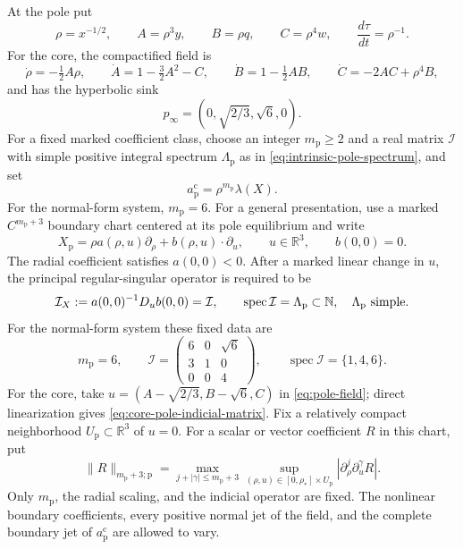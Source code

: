 \documentclass[11pt]{amsart}
\numberwithin{equation}{section}
\theoremstyle{definition}
\theoremstyle{remark}
\newcommand{\R}{\mathbb R}
\newcommand{\spec}{\operatorname {spec}}
\begin{document}
At the pole put
\begin{equation}\label{eq:pole-coordinates}
 \rho=x^{-1/2},\qquad A=\rho^3y,\qquad
 B=\rho q,\qquad C=\rho^4w,
 \qquad \frac{d\tau}{dt}=\rho^{-1}.
\end{equation}
For the core, the compactified field is
\begin{equation}\label{eq:pole-field}
 \dot\rho=-\tfrac12A\rho,\qquad
 \dot A=1-\tfrac32A^2-C,\qquad
 \dot B=1-\tfrac12AB,\qquad
 \dot C=-2AC+\rho^4B,
\end{equation}
and has the hyperbolic sink
\begin{equation}\label{eq:pole-sink}
 p_\infty=(0,\sqrt{2/3},\sqrt6,0).
\end{equation}
For a fixed marked coefficient class, choose an integer
$m_{\mathrm p}\ge2$ and a real matrix $\mathcal I$ with simple positive
integral spectrum $\Lambda_{\mathrm p}$ as in
\eqref{eq:intrinsic-pole-spectrum}, and set
\begin{equation}\label{eq:general-compactified-action-order}
 a_{\mathrm p}^{\mathrm c}=\rho^{m_{\mathrm p}}\lambda(X).
\end{equation}
For the normal-form system, $m_{\mathrm p}=6$.  For a general
presentation, use a marked $C^{m_{\mathrm p}+3}$ boundary
chart centered at its pole equilibrium and write
\begin{equation}\label{eq:general-pole-field}
 X_{\mathrm p}
 =\rho a(\rho,u)\partial_\rho+b(\rho,u)\cdot\partial_u,
 \qquad u\in\R^3,\qquad b(0,0)=0.
\end{equation}
The radial coefficient satisfies $a(0,0)<0$.  After a marked linear change
in $u$, the principal regular-singular operator is required to be
\begin{equation}\label{eq:pole-indicial-matrix}
 \mathcal I_X:=a(0,0)^{-1}D_ub(0,0)=\mathcal I,
 \qquad
 \spec\mathcal I=\Lambda_{\mathrm p}\subset\mathbb N,
 \quad \Lambda_{\mathrm p}\ \hbox{simple}.
\end{equation}
For the normal-form system these fixed data are
\begin{equation}\label{eq:core-pole-indicial-matrix}
 m_{\mathrm p}=6,\qquad
 \mathcal I=
 \begin{pmatrix}
  6&0&\sqrt6\\
  3&1&0\\
  0&0&4
 \end{pmatrix},
 \qquad \spec\mathcal I=\{1,4,6\}.
\end{equation}
For the core, take
$u=(A-\sqrt{2/3},B-\sqrt6,C)$ in \eqref{eq:pole-field}; direct
linearization gives \eqref{eq:core-pole-indicial-matrix}.  Fix a relatively
compact neighborhood $U_{\mathrm p}\subset\R^3$ of $u=0$.  For a scalar
or vector coefficient $R$ in this chart, put
\begin{equation}\label{eq:pole-norm}
 \|R\|_{m_{\mathrm p}+3;\mathrm p}
 =\max_{j+|\gamma|\le m_{\mathrm p}+3}
   \sup_{(\rho,u)\in[0,\rho_*]\times U_{\mathrm p}}
   |\partial_\rho^j\partial_u^\gamma R|.
\end{equation}
Only $m_{\mathrm p}$, the radial scaling, and the indicial operator are
fixed.  The
nonlinear boundary coefficients, every positive normal jet of the field,
and the complete boundary jet of $a_{\mathrm p}^{\mathrm c}$ are allowed
to vary.
\end{document}
